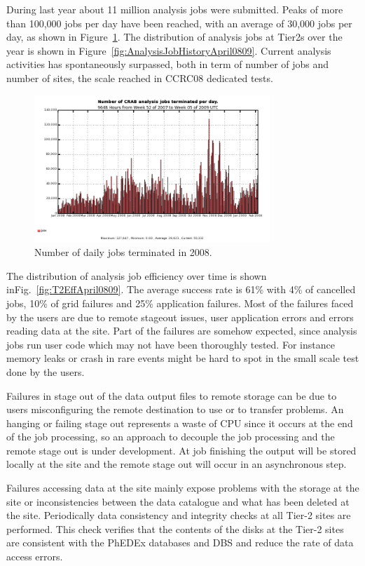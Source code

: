 During last year about 11 million analysis jobs were submitted.  Peaks
of more than 100,000 jobs per day have been reached, with an average
of 30,000 jobs per day, as shown in Figure~\ref{fig:jobs}.
The distribution of analysis jobs at Tier2s over the year is shown in Figure~\ref{fig:AnalysisJobHistoryApril0809}. Current analysis activities has spontaneously surpassed, both in term of number of jobs and number of sites, the scale reached in CCRC08 dedicated tests. 
\begin{figure}
\includegraphics[width=3.5in]{figures/crabjobsdaily.png}
\caption{Number of daily jobs terminated in 2008. }
\label{fig:jobs}
\end{figure}

The distribution of analysis job efficiency over time is shown inFig.~\ref{fig:T2EffApril0809}. The average success rate is 61\% with 4\% of cancelled jobs, 10\% of grid failures and 25\% application failures.
Most of the failures faced by the users are due to remote stageout issues, user application errors and errors reading data at the site. 
Part of the failures are somehow expected, since analysis jobs run user code which may not have been thoroughly tested. For instance memory leaks or crash in rare events might be hard to spot in the small scale test done by the users.

Failures in stage out of the data output files to remote storage can be due 
to users misconfiguring the remote destination to use or to transfer problems.
An hanging or failing stage out represents a waste of CPU since it occurs at 
the end of the job processing, so an approach to decouple the job processing and the remote stage out is under development. At job finishing the output will be stored locally at the site and the remote stage out will occur in an asynchronous step.

Failures accessing data at the site mainly expose problems with the storage at the site or inconsistencies between the data catalogue and what has been deleted at the site. 
Periodically data consistency and integrity checks at all Tier-2 sites are performed. This check verifies that the contents of the disks at the Tier-2 sites are consistent with the PhEDEx databases and DBS and reduce the rate of data access errors.


